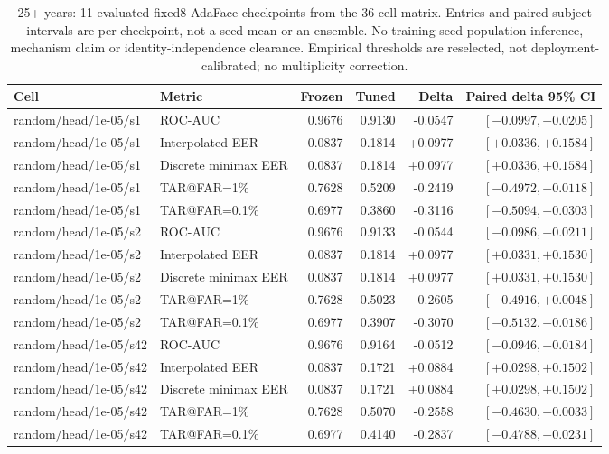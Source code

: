 \begin{table}[!t]
\caption{25+ years: 11 evaluated fixed8 AdaFace checkpoints from the 36-cell matrix. Entries and paired subject intervals are per checkpoint, not a seed mean or an ensemble. No training-seed population inference, mechanism claim or identity-independence clearance. Empirical thresholds are reselected, not deployment-calibrated; no multiplicity correction.}
\label{tab:strong-fixed8-large-gap-25plus}
\centering\scriptsize
\begin{tabular}{@{}llrrrr@{}}
\toprule
Cell & Metric & Frozen & Tuned & Delta & Paired delta 95\% CI \\
\midrule
random/head/1e-05/s1 & ROC-AUC & 0.9676 & 0.9130 & -0.0547 & $[-0.0997,-0.0205]$ \\
random/head/1e-05/s1 & Interpolated EER & 0.0837 & 0.1814 & +0.0977 & $[+0.0336,+0.1584]$ \\
random/head/1e-05/s1 & Discrete minimax EER & 0.0837 & 0.1814 & +0.0977 & $[+0.0336,+0.1584]$ \\
random/head/1e-05/s1 & TAR@FAR=1\% & 0.7628 & 0.5209 & -0.2419 & $[-0.4972,-0.0118]$ \\
random/head/1e-05/s1 & TAR@FAR=0.1\% & 0.6977 & 0.3860 & -0.3116 & $[-0.5094,-0.0303]$ \\
random/head/1e-05/s2 & ROC-AUC & 0.9676 & 0.9133 & -0.0544 & $[-0.0986,-0.0211]$ \\
random/head/1e-05/s2 & Interpolated EER & 0.0837 & 0.1814 & +0.0977 & $[+0.0331,+0.1530]$ \\
random/head/1e-05/s2 & Discrete minimax EER & 0.0837 & 0.1814 & +0.0977 & $[+0.0331,+0.1530]$ \\
random/head/1e-05/s2 & TAR@FAR=1\% & 0.7628 & 0.5023 & -0.2605 & $[-0.4916,+0.0048]$ \\
random/head/1e-05/s2 & TAR@FAR=0.1\% & 0.6977 & 0.3907 & -0.3070 & $[-0.5132,-0.0186]$ \\
random/head/1e-05/s42 & ROC-AUC & 0.9676 & 0.9164 & -0.0512 & $[-0.0946,-0.0184]$ \\
random/head/1e-05/s42 & Interpolated EER & 0.0837 & 0.1721 & +0.0884 & $[+0.0298,+0.1502]$ \\
random/head/1e-05/s42 & Discrete minimax EER & 0.0837 & 0.1721 & +0.0884 & $[+0.0298,+0.1502]$ \\
random/head/1e-05/s42 & TAR@FAR=1\% & 0.7628 & 0.5070 & -0.2558 & $[-0.4630,-0.0033]$ \\
random/head/1e-05/s42 & TAR@FAR=0.1\% & 0.6977 & 0.4140 & -0.2837 & $[-0.4788,-0.0231]$ \\

\end{tabular}
\end{table}
